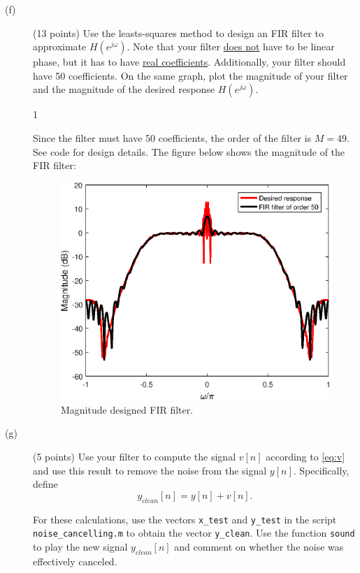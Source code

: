 \documentclass[10pt]{article}
\def\SOLUTIONS{1} %
\def\SolutionsColor{red2}
\begin{document}
\begin{description}
	\item[(f)] (13 points) Use the leasts-squares method to design an FIR filter to approximate $H(e^{j\omega})$. Note that your filter \underline{does not} have to be linear phase, but it has to have \underline{real coefficients}. Additionally, your filter should have 50 coefficients. On the same graph, plot the magnitude of your filter and the magnitude of the desired response $H(e^{j\omega})$.
	
	\if\SOLUTIONS1 {\color{\SolutionsColor} Since the filter must have 50 coefficients, the order of the filter is $M = 49$. See code for design details. The figure below shows the magnitude of the FIR filter:
		\FloatBarrier
		\begin{figure}[h!]
			\centering
			\includegraphics[scale=0.7]{figs/noise_cancel_Hfir.eps}
			\caption{Magnitude designed FIR filter.}
			\label{fig:noise_cancel_Hfir}
		\end{figure}
		\FloatBarrier	
	}\fi
	
	\item[(g)] (5 points) Use your filter to compute the signal $v[n]$ according to \eqref{eq:v} and use this result to remove the noise from the  signal $y[n]$. Specifically, define
	\begin{equation}
		y_{clean}[n] = y[n] + v[n].
	\end{equation}
	
	For these calculations, use the vectors \texttt{x\_test} and \texttt{y\_test} in the script \texttt{noise\_cancelling.m} to obtain the vector \texttt{y\_clean}. Use the function \texttt{sound} to play the new signal $y_{clean}[n]$ and comment on whether the noise was effectively canceled. 
	

\end{description}
\end{document}
